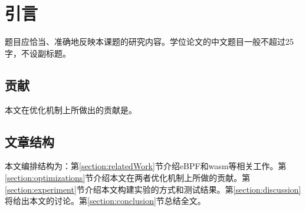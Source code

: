 
\section{引言}
题目应恰当、准确地反映本课题的研究内容。学位论文的中文题目一般不超过25字，不设副标题。
\subsection{贡献}
本文在优化机制上所做出的贡献是。
\subsection{文章结构}
本文编排结构为：第\ref{section:relatedWork}节介绍eBPF和wasm等相关工作。第\ref{section:optimizations}节介绍本文在两者优化机制上所做的贡献。第\ref{section:experiment}节介绍本文构建实验的方式和测试结果。第\ref{section:discussion}将给出本文的讨论。第\ref{section:conclusion}节总结全文。
